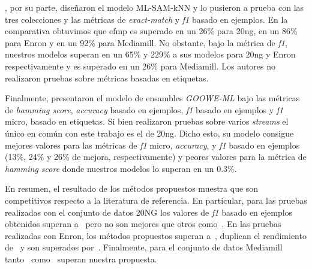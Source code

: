 \citeauthor{roseberry_multi-label_2018}, por su parte, diseñaron el modelo
ML-SAM-kNN y lo pusieron a prueba con las tres colecciones y las métricas de
\textit{exact-match} y \textit{f1} basado en ejemplos. En la comparativa
obtuvimos que \acrshort{efmp} es superado en un 26\% para 20ng, en un 86\% para
Enron y en un 92\% para Mediamill. No obstante, bajo la métrica de \textit{f1},
nuestros modelos superan en un 65\% y 229\% a sus modelos para 20ng y Enron
respectivamente y es superado en un 26\% para Mediamill. Los autores no
realizaron pruebas sobre métricas basadas en etiquetas.

Finalmente, \citeauthor{buyukcakir_novel_2018} presentaron el modelo de
ensambles \textit{GOOWE-ML} bajo las métricas de \textit{hamming score},
\textit{accuracy} basado en ejemplos, \textit{f1} basado en ejemplos y
\textit{f1} micro, basado en etiquetas. Si bien realizaron pruebas sobre varios
\textit{streams} el único en común con este trabajo es el de 20ng. Dicho esto,
su modelo consigue mejores valores para las métricas de \textit{f1} micro,
\textit{accuracy}, y \textit{f1} basado en ejemplos (13\%, 24\% y 26\% de
mejora, respectivamente) y peores valores para la métrica de \textit{hamming
	score} donde nuestros modelos lo superan en un 0.3\%.

En resumen, el resultado de los métodos propuestos muestra que son competitivos
respecto a la literatura de referencia. En particular, para las pruebas
realizadas con el conjunto de datos 20NG los valores de \textit{f1} basado en
ejemplos obtenidos superan a~\cite{osojnik_multi-label_2017} pero no son mejores
que otros como~\cite{sousa_multi-label_2018, buyukcakir_novel_2018,
	roseberry_multi-label_2018}.  En las pruebas realizadas con Enron, los métodos
propuestos superan a~\cite{osojnik_multi-label_2017}, duplican el rendimiento
de~\cite{roseberry_multi-label_2018} y son superados
por~\cite{sousa_multi-label_2018}. Finalmente, para el conjunto de datos
Mediamill tanto~\cite{sousa_multi-label_2018}
como~\cite{roseberry_multi-label_2018} superan nuestra propuesta.
